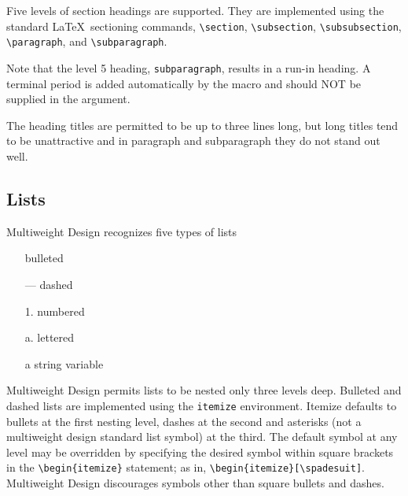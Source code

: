 Five levels of section headings are supported.  They are implemented
using the standard \LaTeX\ sectioning commands, \verb|\section|,
\verb|\subsection|, \verb|\subsubsection|, \verb|\paragraph|, and
\verb|\subparagraph|. 
\begin{note}Note that the level 5 heading,
\verb|subparagraph|, results in a run-in heading.  A terminal period
is added automatically by the macro and should NOT be supplied in the
argument.  
\end{note}

The heading titles are permitted to be up to three lines long, but
long titles tend to be unattractive and in paragraph and subparagraph
they do not stand out well.
\subsection{Lists}
Multiweight Design recognizes five types of lists

\begin{itemize}
  \item[\squarebullet]bulleted
  \item[---]dashed 
  \item[1.]numbered
  \item[a.]lettered
  \item[a string]variable
\end{itemize}
Multiweight Design permits lists to be nested only three levels deep.
Bulleted and dashed lists are implemented using the \verb|itemize|
environment.  Itemize defaults to bullets at the first nesting level,
dashes at the second and asterisks (not a multiweight design standard
list symbol) at the third.  The default symbol at any level may be
overridden by specifying the desired symbol within square brackets
in the \verb|\begin{itemize}| statement; as in,
\verb|\begin{itemize}[\spadesuit]|.  Multiweight Design discourages
symbols other than square bullets and dashes.

